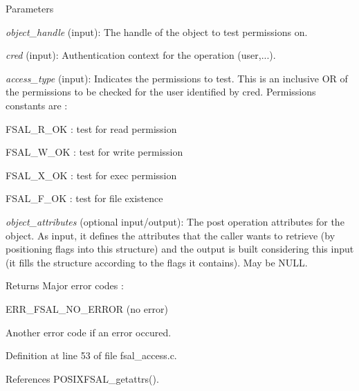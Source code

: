 \begin{DoxyParams}{Parameters}
\item[{\em object\_\-handle}](input): The handle of the object to test permissions on. \item[{\em cred}](input): Authentication context for the operation (user,...). \item[{\em access\_\-type}](input): Indicates the permissions to test. This is an inclusive OR of the permissions to be checked for the user identified by cred. Permissions constants are :
\begin{DoxyItemize}
\item FSAL\_\-R\_\-OK : test for read permission
\item FSAL\_\-W\_\-OK : test for write permission
\item FSAL\_\-X\_\-OK : test for exec permission
\item FSAL\_\-F\_\-OK : test for file existence 
\end{DoxyItemize}\item[{\em object\_\-attributes}](optional input/output): The post operation attributes for the object. As input, it defines the attributes that the caller wants to retrieve (by positioning flags into this structure) and the output is built considering this input (it fills the structure according to the flags it contains). May be NULL.\end{DoxyParams}
\begin{DoxyReturn}{Returns}
Major error codes :
\begin{DoxyItemize}
\item ERR\_\-FSAL\_\-NO\_\-ERROR (no error)
\item Another error code if an error occured. 
\end{DoxyItemize}
\end{DoxyReturn}


Definition at line 53 of file fsal\_\-access.c.

References POSIXFSAL\_\-getattrs().
